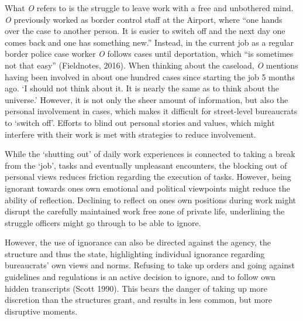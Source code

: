 \noindent What \emph{O} refers to is the struggle to leave work with a free and unbothered mind. \emph{O} previously worked as border control staff at the Airport, where \enquote{one hands over the case to another person. It is easier to switch off and the next day one comes back and one has something new.} Instead, in the current job as a regular border police case worker \emph{O} follows cases until deportation, which \enquote{is sometimes not that easy} (Fieldnotes, 2016). When thinking about the caseload, \emph{O} mentions having been involved in about one hundred cases since starting the job 5 months ago. ‘I should not think about it. It is nearly the same as to think about the universe.’ However, it is not only the sheer amount of information, but also the personal involvement in cases, which makes it difficult for street-level bureaucrats to ‘switch off’. Efforts to blind out personal stories and values, which might interfere with their work is met with strategies to reduce involvement.
\par
While the ‘shutting out’ of daily work experiences is connected to taking a break from the ‘job’, tasks and eventually unpleasant encounters, the blocking out of personal views reduces friction regarding the execution of tasks. However, being ignorant towards ones own emotional and political viewpoints might reduce the ability of reflection. Declining to reflect on ones own positions during work might disrupt the carefully maintained work free zone of private life, underlining the struggle officers might go through to be able to ignore.
\par
However, the use of ignorance can also be directed against the agency, the structure and thus the state, highlighting individual ignorance regarding bureaucrats’ own views and norms. Refusing to take up orders and going against guidelines and regulations is an active decision to ignore, and to follow own hidden transcripts (Scott 1990). This bears the danger of taking up more discretion than the structures grant, and results in less common, but more disruptive moments.
